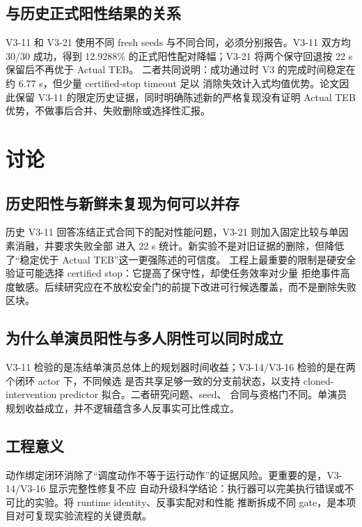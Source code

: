 \documentclass[12pt,a4paper,oneside]{report}
\begin{document}
\section{与历史正式阳性结果的关系}
V3-11 和 V3-21 使用不同 fresh seeds 与不同合同，必须分别报告。V3-11 双方均 30/30 成功，得到
12.9288\% 的正式阳性配对降幅；V3-21 将两个保守回退按 22 s 保留后不再优于 Actual TEB。
二者共同说明：成功通过时 V3 的完成时间稳定在约 6.77 s，但少量 certified-stop timeout 足以
消除失效计入式均值优势。论文因此保留 V3-11 的限定历史证据，同时明确陈述新的严格复现没有证明
Actual TEB 优势，不做事后合并、失败删除或选择性汇报。

\chapter{讨论}
\section{历史阳性与新鲜未复现为何可以并存}
历史 V3-11 回答冻结正式合同下的配对性能问题，V3-21 则加入固定比较与单因素消融，并要求失败全部
进入 22 s 统计。新实验不是对旧证据的删除，但降低了“稳定优于 Actual TEB”这一更强陈述的可信度。
工程上最重要的限制是硬安全验证可能选择 certified stop：它提高了保守性，却使任务效率对少量
拒绝事件高度敏感。后续研究应在不放松安全门的前提下改进可行候选覆盖，而不是删除失败区块。

\section{为什么单演员阳性与多人阴性可以同时成立}
V3-11 检验的是冻结单演员总体上的规划器时间收益；V3-14/V3-16 检验的是在两个闭环 actor 下，不同候选
是否共享足够一致的分支前状态，以支持 cloned-intervention predictor 拟合。二者研究问题、seed、
合同与资格门不同。单演员规划收益成立，并不逻辑蕴含多人反事实可比性成立。

\section{工程意义}
动作绑定闭环消除了“调度动作不等于运行动作”的证据风险。更重要的是，V3-14/V3-16 显示完整性修复不应
自动升级科学结论：执行器可以完美执行错误或不可比的实验。将 runtime identity、反事实配对和性能
推断拆成不同 gate，是本项目对可复现实验流程的关键贡献。
\end{document}
